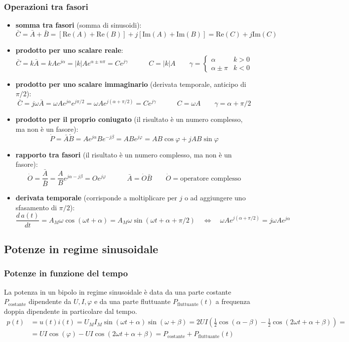 \documentclass[a4paper]{article}
\newcommand\Real{\text{Re}}
\newcommand\Img{\text{Im}}
\begin{document}
\subsubsection*{Operazioni tra fasori}
\begin{itemize}
	\item \textbf{somma tra fasori} (somma di sinusoidi):
	\[\bar{C} = \bar{A} + \bar{B} = [\Real(A) + \Real(B)] + j [\Img(A) + \Img(B)] = \Real(C) + j \Img(C)\]
	\item \textbf{prodotto per uno scalare reale}:
	\[\bar{C} = k \bar{A} = k A e^{j\alpha} = \left|k\right| A e^{\alpha \pm n \pi} = Ce^{j\gamma}
	\qquad\quad C = \left|k\right| A \qquad \gamma = \begin{cases} \alpha & k > 0 \\ \alpha \pm \pi & k < 0 \end{cases}\]
	\item \textbf{prodotto per uno scalare immaginario} (derivata temporale, anticipo di \(\pi/2\)):
	\[\bar{C} = j\omega \bar{A} = \omega A e^{j\alpha}e^{j \pi / 2} = \omega A e^{j(\alpha + \pi/2)} = Ce^{j\gamma}
	\qquad\quad C = \omega A \qquad \gamma = \alpha + \pi/2\]
	\item \textbf{prodotto per il proprio coniugato} (il risultato è un numero complesso, ma non è un fasore):
	\[\dot{P} = \bar{A} \check{B} = Ae^{j\alpha}Be^{-j\beta} = AB e^{j\varphi} = AB\cos\varphi + jAB\sin\varphi\]
	\item \textbf{rapporto tra fasori} (il risultato è un numero complesso, ma non è un fasore):
	\[\dot{O} = \frac{\bar{A}}{\bar{B}} = \frac{A}{B} e^{j\alpha - j\beta} = Oe^{j\varphi} \qquad\quad \bar{A} = \dot{O} \bar{B} \qquad \dot{O} = \text{operatore complesso}\]
	\item \textbf{derivata temporale} (corrisponde a moltiplicare per \(j\) o ad aggiungere uno sfasamento di \(\pi/2\)):
	\[\frac{d \, a(t)}{dt} = A_M \omega \cos(\omega t + \alpha) = A_M \omega \sin(\omega t + \alpha + \pi/2 ) \quad\Leftrightarrow\quad \omega A e^{j(\alpha + \pi/2)} = j \omega A e^{j\alpha}\]
\end{itemize}

\newpage

\subsection{Potenze in regime sinusoidale}
\subsubsection*{Potenze in funzione del tempo}
La potenza in un bipolo in regime sinusoidale è data da una parte costante \(P_\text{costante}\) dipendente da \(U, I, \varphi\)
e da una parte fluttuante \(P_\text{fluttuante}(t)\) a frequenza doppia dipendente in particolare dal tempo.
\begin{align*}
	p(t) &= u(t) i(t) = U_M I_M \sin(\omega t + \alpha) \sin (\omega + \beta) = 2UI \left(\frac{1}{2} \cos(\alpha-\beta) - \frac{1}{2} \cos(2\omega t + \alpha + \beta)\right) = \\
	&= UI \cos(\varphi) - UI \cos (2 \omega t + \alpha + \beta) = P_\text{costante} + P_\text{fluttuante}(t)
\end{align*}
\end{document}
